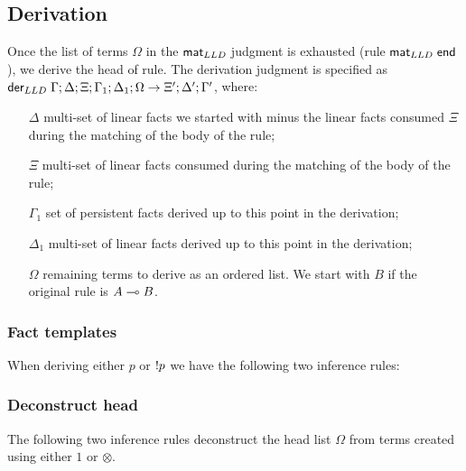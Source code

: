 

\subsection{Derivation}

Once the list of terms $\Omega$ in the $\mathsf{mat}_{LLD} \;$judgment is exhausted (rule $\mathsf{mat}_{LLD} \;
\mathsf{end}$), we derive the head of rule.  The derivation judgment is
specified as $\mathsf{der}_{LLD} \; \Gamma; \Delta; \Xi; \Gamma_1; \Delta_1; \Omega \rightarrow
\Xi'; \Delta'; \Gamma'$, where:

\begin{enumerate}

   \item[$\Delta$] multi-set of linear facts we started with minus the linear
   facts consumed $\Xi$ during the matching of the body of the rule;

   \item[$\Xi$] multi-set of linear facts consumed during the matching of the
   body of the rule;

   \item[$\Gamma_1$] set of persistent facts derived up to this point in the
   derivation;

   \item[$\Delta_1$] multi-set of linear facts derived up to this point in the
   derivation;

   \item[$\Omega$] remaining terms to derive as an ordered list. We start with
   $B$ if the original rule is $A \multimap B$.

\end{enumerate}

\subsubsection{Fact templates}

When deriving either $p$ or ${!} p$ we have the following two inference rules:



\subsubsection{Deconstruct head}

The following two inference rules deconstruct the head list $\Omega$ from terms
created using either $1$ or $\otimes$.



